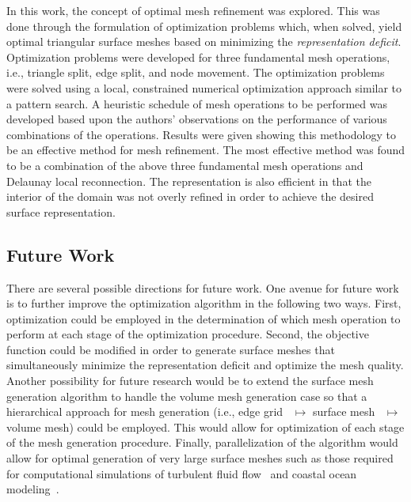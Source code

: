 In this work, the concept of optimal mesh refinement was explored. This
was done through the formulation of optimization problems which, when 
solved, yield optimal triangular surface meshes based on minimizing the 
{\it representation deficit}.  Optimization problems were developed for 
three fundamental mesh operations, i.e., triangle split, edge split, and 
node movement.  The optimization problems were solved using a 
local, constrained numerical optimization approach similar to a pattern 
search.  A heuristic schedule of mesh operations to be performed was 
developed based upon the authors' observations on the performance 
of various combinations of the operations.  Results were given showing 
this methodology to be an effective
method for mesh refinement. The most effective method was found to be a
combination of the above three fundamental mesh operations and Delaunay
local reconnection. The representation is also efficient in that the
interior of the domain was not overly refined in order to achieve the
desired surface representation.

\subsection{Future Work}
There are several possible directions for future work.  One avenue for
future work is to further improve the optimization algorithm in the
following two ways.  First, optimization could be employed in the
determination of which mesh operation to perform at each stage of the
optimization procedure.  Second, the objective function could be
modified in order to generate surface meshes that simultaneously
minimize the representation deficit and optimize the mesh quality.
Another possibility for future research would be to extend the surface
mesh generation algorithm to handle the volume mesh generation case so
that a hierarchical approach for mesh generation (i.e., edge
grid~\cite{mclaurin13} $\mapsto$ surface mesh~\cite{mclaurin14}
$\mapsto$ volume mesh) could be employed. This would allow for
optimization of each stage of the mesh generation procedure.  Finally,
parallelization of the algorithm would allow for optimal generation of
very large surface meshes such as those required for computational
simulations of turbulent fluid flow~\cite{turbulence} and coastal
ocean modeling~\cite{coastal_ocean_modeling}.
